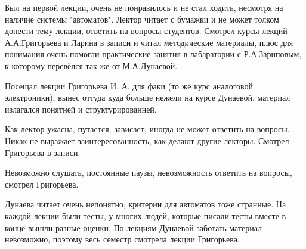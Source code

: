             \begin{commentbox} 
                Был на первой лекции, очень не понравилось и не стал ходить, несмотря на наличие системы "автоматов". Лектор читает с бумажки и не может толком донести тему лекции, ответить на вопросы студентов. Смотрел курсы лекций А.А.Григорьева и Ларина в записи и читал методические материалы, плюс для понимания очень помогли практические занятия в лабаратории с Р.А.Зариповым, к которому перевёлся так же от М.А.Дунаевой. 
            \end{commentbox} 
        
            \begin{commentbox} 
                Посещал лекции Григорьева И. А. для факи (то же курс аналоговой электроники), вынес оттуда куда больше нежели на курсе Дунаевой, материал излагался понятней и структурированней. 
            \end{commentbox} 
        
            \begin{commentbox} 
                Как лектор ужасна, путается, зависает, иногда не может ответить на вопросы. Никак не выражает заинтересованность, как делают другие лекторы. Смотрел Григорьева в записи. 
            \end{commentbox} 
        
            \begin{commentbox} 
                Невозможно слушать, постоянные паузы, невозможность ответить на вопросы, смотрел Григорьева. 
            \end{commentbox} 
        
            \begin{commentbox} 
                Дунаева читает очень непонятно, критерии для автоматов тоже странные. На каждой лекции были тесты, у многих людей, которые писали тесты вместе в конце вышли разные оценки. По лекциям Дунаевой заботать материал невозможно, поэтому весь семестр смотрела лекции Григорьева. 
            \end{commentbox} 
        
